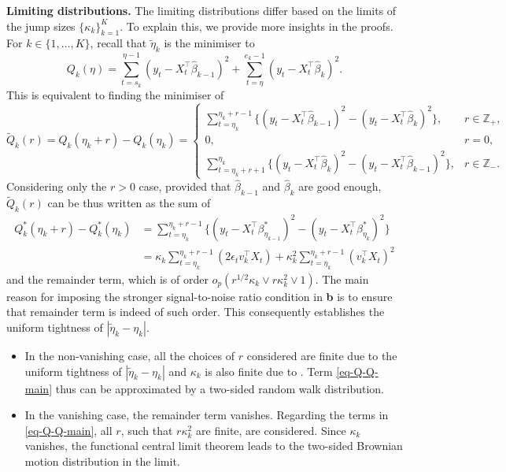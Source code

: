 \documentclass[11pt]{article}
\theoremstyle{plain}
\theoremstyle{definition}
\begin{document}
\medskip
\noindent \textbf{Limiting distributions.}  The limiting distributions differ based on the limits of the jump sizes $\{\kappa_k\}_{k = 1}^K$.  To explain this, we provide more insights in the proofs.  For $k \in \{1, \ldots, K\}$, recall that $\widetilde{\eta}_k$ is the minimiser to
\[
    Q_k(\eta) = \sum_{t = s_k }^{\eta-1}(y_t - X_t^{\top}\widehat{\beta}_{k-1})^2 + \sum_{t = \eta}^{e_k-1}(y_t - X_t^{\top}\widehat{\beta}_{k})^2.
\]
This is equivalent to finding the minimiser of 
\[
    \widetilde{Q}_k(r) = Q_k(\eta_k + r) - Q_k(\eta_k) = \begin{cases}
        \sum_{t = \eta_k}^{\eta_k + r - 1} \big\{(y_t - X_t^{\top}\widehat{\beta}_{k-1})^2 - (y_t - X_t^{\top}\widehat{\beta}_{k})^2\big\}, & r \in \mathbb{Z}_+,\\
        0, & r = 0, \\
        \sum_{t = \eta_k + r + 1}^{\eta_k} \big\{(y_t - X_t^{\top}\widehat{\beta}_{k})^2 - (y_t - X_t^{\top}\widehat{\beta}_{k-1})^2\big\}, & r \in \mathbb{Z}_-.
    \end{cases}
\]
Considering only the $r > 0$ case, provided that $\widehat{\beta}_{k-1}$ and $\widehat{\beta}_{k}$ are good enough, $\widetilde{Q}_k(r)$ can be thus written as the sum of
\begin{align}
    Q^*_k(\eta_k + r) - Q^*_k(\eta_k) & = \sum_{t = \eta_k}^{\eta_k + r - 1} \big\{(y_t - X_t^{\top}\beta_{\eta_{k-1}}^*)^2 - (y_t - X_t^{\top}\beta_{\eta_{k}}^*)^2\big\} \nonumber \\
    & = \kappa_k \sum_{t = \eta_k}^{\eta_k + r - 1}(2\epsilon_tv_k^{\top}X_t) + \kappa_k^2 \sum_{t = \eta_k}^{\eta_k + r - 1} (v_k^{\top}X_t)^2 \label{eq-Q-Q-main}
\end{align} 
and the remainder term, which is of order $o_p(r^{1/2}\kappa_k \vee r\kappa_k^2 \vee 1)$. The main reason for imposing the stronger signal-to-noise ratio condition in \textbf{b} is to ensure that remainder term is indeed of such order.  This consequently establishes the uniform tightness of $|\widetilde{\eta}_k - \eta_k|$.

\begin{itemize}
    \item In the non-vanishing case, all the choices of $r$ considered are finite due to the uniform tightness of $|\widetilde{\eta}_k - \eta_k|$ and $\kappa_k$ is also finite due to . Term \eqref{eq-Q-Q-main} thus can be approximated by a two-sided random walk distribution.  
    \item In the vanishing case, the remainder term vanishes.  Regarding the terms in \eqref{eq-Q-Q-main}, all $r$, such that $r\kappa_k^2$ are finite, are considered. Since $\kappa_k$ vanishes, the functional central limit theorem leads to the two-sided Brownian motion distribution in the limit.  
\end{itemize}
\end{document}
